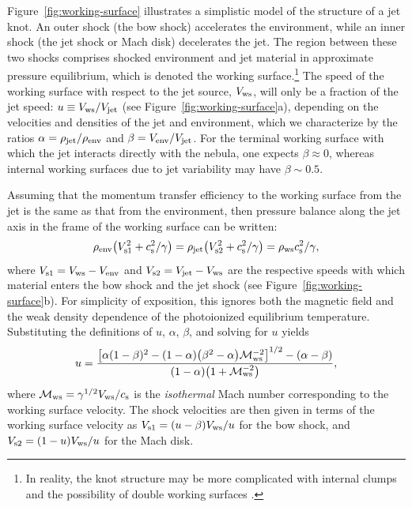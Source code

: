 \documentclass[useAMS, usenatbib]{mnras}
\begin{document}
Figure~\ref{fig:working-surface} illustrates a simplistic model of the structure of a jet knot.  An outer shock (the bow shock) accelerates the environment, while an inner shock (the jet shock or Mach disk) decelerates the jet.
The region between these two shocks comprises shocked environment and jet material in approximate pressure equilibrium,
which is denoted the working surface.\footnote{
  In reality, the knot structure may be more complicated
  with internal clumps \citep{Hansen:2017a, Yirak:2009a, Yirak:2012a}
  and the possibility of double working surfaces \citep{Raga:2017b}.  
}
The speed of the working surface with respect to the jet source, \(V_{\mathrm{ws}}\),
will only be a fraction of the jet speed: \(u \equiv V_{\mathrm{ws}} / V_{\mathrm{jet}}\)
(see Figure~\ref{fig:working-surface}a),
depending on the velocities and densities of the jet and environment,
which we characterize by the ratios \(\alpha = \rho_{\mathrm{jet}}/\rho_{\mathrm{env}}\) and \(\beta = V_{\mathrm{env}}/V_{\mathrm{jet}}\).
For the terminal working surface with which the jet interacts directly with the nebula, one expects \(\beta \approx 0\),
whereas internal working surfaces due to jet variability may have \(\beta \sim 0.5\).

Assuming that the momentum transfer efficiency
to the working surface from the jet
is the same as that from the environment,
then pressure balance along the jet axis
in the frame of the working surface can be written:
\newcommand\subs[1]{\ensuremath{_{\text{s#1}}}}
\begin{equation}
  \label{eq:pressure-balance}
  \rho\env \bigl( V\subs1^2 + \sound^2/\gamma \bigr)
  = \rho\jet \bigl( V\subs2^2 + \sound^2/\gamma \bigr)
  = \rho\ws \sound^2/\gamma ,
\end{equation}
where \(V\subs1 = V\ws - V\env\) and \(V\subs2 = V\jet - V\ws\)
are the respective speeds with which material enters the bow shock
and the jet shock (see Figure~\ref{fig:working-surface}b).
For simplicity of exposition, this ignores both the magnetic field
and the weak density dependence of the photoionized equilibrium temperature. 
Substituting the definitions of \(u\), \(\alpha\), \(\beta\),
and solving for \(u\) yields
\begin{equation}
  \label{eq:u}
  u = \frac{
    \bigl[
    \alpha (1 - \beta)^2 - (1 - \alpha) \bigl( \beta^2 - \alpha \bigr) \mathcal{M}_{\mathrm{ws}}^{-2}
    \bigr]^{1/2} - (\alpha - \beta)
  }{
    (1 - \alpha) \bigl( 1 + \mathcal{M}_{\mathrm{ws}}^{-2} \bigr)
  } , 
\end{equation}
where \(\mathcal{M}_{\mathrm{ws}} = \gamma^{1/2} V_{\mathrm{ws}}/c_{\mathrm{s}}\) is the \emph{isothermal} Mach number corresponding to the working surface velocity. 
The shock velocities are then given in terms of the working surface velocity as  
\(V\subs1 = (u - \beta) V\ws /u \) for the bow shock,
and \(V\subs2 = (1 - u) V\ws /u \) for the Mach disk.
\end{document}

